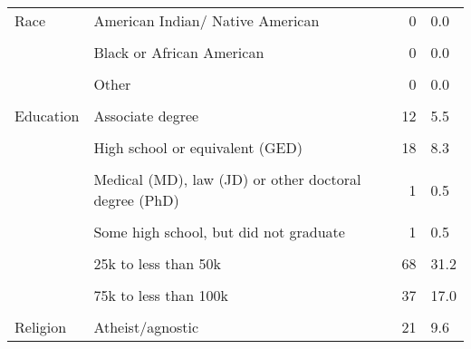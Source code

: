 \documentclass[border=1mm]{standalone}
\begin{document}
\begin{table}[!h]
\begin{tabular}[t]{lllrl}
Race & American Indian/ Native American &  & 0 & 0.0\\
\addlinespace
\cellcolor{gray!10}{} & \cellcolor{gray!10}{Asian American} & \cellcolor{gray!10}{} & \cellcolor{gray!10}{0} & \cellcolor{gray!10}{0.0}\\
 & Black or African American &  & 0 & 0.0\\
\cellcolor{gray!10}{} & \cellcolor{gray!10}{Hispanic or Latino} & \cellcolor{gray!10}{} & \cellcolor{gray!10}{0} & \cellcolor{gray!10}{0.0}\\
 & Other &  & 0 & 0.0\\
\cellcolor{gray!10}{} & \cellcolor{gray!10}{White, not-Hispanic} & \cellcolor{gray!10}{} & \cellcolor{gray!10}{218} & \cellcolor{gray!10}{100.0}\\
\addlinespace
Education & Associate degree &  & 12 & 5.5\\
\cellcolor{gray!10}{} & \cellcolor{gray!10}{Bachelor's degree (BA/BS)} & \cellcolor{gray!10}{} & \cellcolor{gray!10}{124} & \cellcolor{gray!10}{56.9}\\
 & High school or equivalent (GED) &  & 18 & 8.3\\
\cellcolor{gray!10}{} & \cellcolor{gray!10}{Master's degree (MA/MS/MBA)} & \cellcolor{gray!10}{} & \cellcolor{gray!10}{53} & \cellcolor{gray!10}{24.3}\\
 & Medical (MD), law (JD) or other doctoral degree (PhD) &  & 1 & 0.5\\
\addlinespace
\cellcolor{gray!10}{} & \cellcolor{gray!10}{Some college, but did not complete a degree} & \cellcolor{gray!10}{} & \cellcolor{gray!10}{9} & \cellcolor{gray!10}{4.1}\\
 & Some high school, but did not graduate &  & 1 & 0.5\\
\cellcolor{gray!10}{Income} & \cellcolor{gray!10}{100k or more} & \cellcolor{gray!10}{} & \cellcolor{gray!10}{12} & \cellcolor{gray!10}{5.5}\\
 & 25k to less than 50k &  & 68 & 31.2\\
\cellcolor{gray!10}{} & \cellcolor{gray!10}{50k to less than 75k} & \cellcolor{gray!10}{} & \cellcolor{gray!10}{79} & \cellcolor{gray!10}{36.2}\\
\addlinespace
 & 75k to less than 100k &  & 37 & 17.0\\
\cellcolor{gray!10}{} & \cellcolor{gray!10}{Less than 25k} & \cellcolor{gray!10}{} & \cellcolor{gray!10}{22} & \cellcolor{gray!10}{10.1}\\
Religion & Atheist/agnostic &  & 21 & 9.6\\

\end{tabular}
\end{table}
\end{document}
